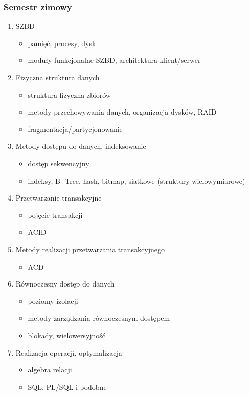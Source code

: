 \documentclass[12pt]{article}
\begin{document}
\subsubsection{Semestr zimowy}
\begin{enumerate}
\item \ac{SZBD}
\begin{itemize}
\item pamięć, procesy, dysk
\item moduły funkcjonalne \ac{SZBD}, architektura klient/serwer
\end{itemize}
\item Fizyczna struktura danych
\begin{itemize}
\item struktura fizyczna zbiorów
\item metody przechowywania danych, organizacja dysków, \acs{RAID}
\item fragmentacja/partycjonowanie
\end{itemize}
\item Metody dostępu do danych, indeksowanie
\begin{itemize}
\item dostęp sekwencyjny
\item indeksy, \ac{B--Tree}, hash, bitmap, siatkowe (struktury wielowymiarowe)
\end{itemize}
\item Przetwarzanie transakcyjne
\begin{itemize}
\item pojęcie transakcji
\item \ac{ACID}
\end{itemize}
\item Metody realizacji przetwarzania transakcyjnego
\begin{itemize}
\item ACD
\end{itemize}
\item Równoczesny dostęp do danych
\begin{itemize}
\item poziomy izolacji
\item metody zarządzania równoczesnym dostępem
\item blokady, wielowersyjność
\end{itemize}
\item Realizacja operacji, optymalizacja
\begin{itemize}
\item algebra relacji
\item SQL, PL/SQL i podobne

\end{itemize}
\end{enumerate}
\end{document}
